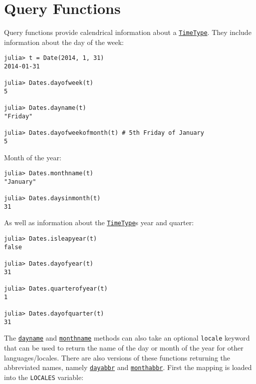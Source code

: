 \hypertarget{16158364891045757229}{}


\section{Query Functions}



Query functions provide calendrical information about a \hyperlink{4438614350756187528}{\texttt{TimeType}}. They include information about the day of the week:




\begin{verbatim}
julia> t = Date(2014, 1, 31)
2014-01-31

julia> Dates.dayofweek(t)
5

julia> Dates.dayname(t)
"Friday"

julia> Dates.dayofweekofmonth(t) # 5th Friday of January
5
\end{verbatim}



Month of the year:




\begin{verbatim}
julia> Dates.monthname(t)
"January"

julia> Dates.daysinmonth(t)
31
\end{verbatim}



As well as information about the \hyperlink{4438614350756187528}{\texttt{TimeType}}{\textquotesingle}s year and quarter:




\begin{verbatim}
julia> Dates.isleapyear(t)
false

julia> Dates.dayofyear(t)
31

julia> Dates.quarterofyear(t)
1

julia> Dates.dayofquarter(t)
31
\end{verbatim}



The \hyperlink{2440842966718954493}{\texttt{dayname}} and \hyperlink{16585759639636493546}{\texttt{monthname}} methods can also take an optional \texttt{locale} keyword that can be used to return the name of the day or month of the year for other languages/locales. There are also versions of these functions returning the abbreviated names, namely \hyperlink{18198970391837299875}{\texttt{dayabbr}} and \hyperlink{12804940912944832895}{\texttt{monthabbr}}. First the mapping is loaded into the \texttt{LOCALES} variable:




